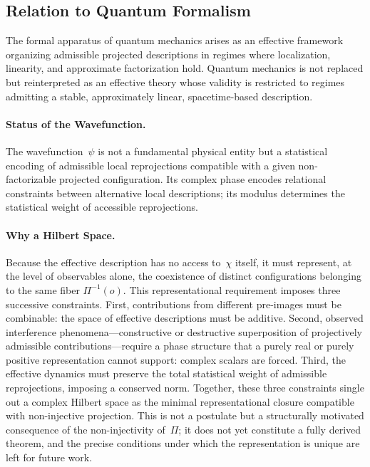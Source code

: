 \subsection{Relation to Quantum Formalism}
  \label{sec:relation-to-quantum-formalism}

  The formal apparatus of quantum mechanics arises as an effective
  framework organizing admissible projected descriptions in regimes where
  localization, linearity, and approximate factorization hold.
  Quantum mechanics is not replaced but reinterpreted as an effective
  theory whose validity is restricted to regimes admitting a stable,
  approximately linear, spacetime-based description.

  \paragraph{Status of the Wavefunction.}
    \label{subsec:status-of-the-wavefunction}
    The wavefunction~$\psi$ is not a fundamental physical entity but a
    statistical encoding of admissible local reprojections compatible with a
    given non-factorizable projected configuration.
    Its complex phase encodes relational constraints between alternative
    local descriptions; its modulus determines the statistical weight of
    accessible reprojections.

  \paragraph{Why a Hilbert Space.}
    \label{subsec:why-hilbert-space}
    Because the effective description has no access to~$\chi$ itself, it
    must represent, at the level of observables alone, the coexistence of
    distinct configurations belonging to the same fiber $\Pi^{-1}(o)$.
    This representational requirement imposes three successive constraints.
    First, contributions from different pre-images must be combinable:
    the space of effective descriptions must be additive.
    Second, observed interference phenomena---constructive or destructive
    superposition of projectively admissible contributions---require a phase
    structure that a purely real or purely positive representation cannot
    support: complex scalars are forced.
    Third, the effective dynamics must preserve the total statistical weight
    of admissible reprojections, imposing a conserved norm.
    Together, these three constraints single out a complex Hilbert space as
    the minimal representational closure compatible with non-injective
    projection.
    This is not a postulate but a structurally motivated consequence of
    the non-injectivity of~$\Pi$; it does not yet constitute a fully
    derived theorem, and the precise conditions under which the
    representation is unique are left for future work.

